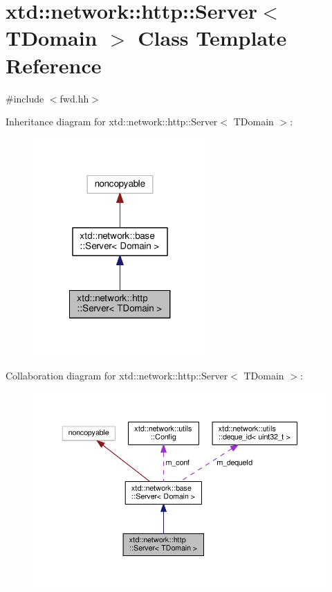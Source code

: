 \hypertarget{classxtd_1_1network_1_1http_1_1Server}{\section{xtd\-:\-:network\-:\-:http\-:\-:Server$<$ T\-Domain $>$ Class Template Reference}
\label{classxtd_1_1network_1_1http_1_1Server}
}


\par
\par
  




{\ttfamily \#include $<$fwd.\-hh$>$}



Inheritance diagram for xtd\-:\-:network\-:\-:http\-:\-:Server$<$ T\-Domain $>$\-:
\nopagebreak
\begin{figure}[H]
\begin{center}
\leavevmode
\includegraphics[width=188pt]{classxtd_1_1network_1_1http_1_1Server__inherit__graph}
\end{center}
\end{figure}


Collaboration diagram for xtd\-:\-:network\-:\-:http\-:\-:Server$<$ T\-Domain $>$\-:
\nopagebreak
\begin{figure}[H]
\begin{center}
\leavevmode
\includegraphics[width=350pt]{classxtd_1_1network_1_1http_1_1Server__coll__graph}
\end{center}
\end{figure}

